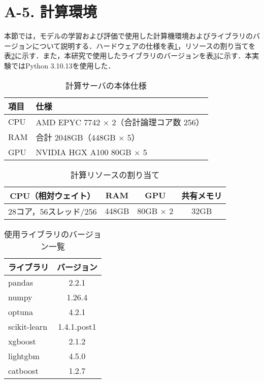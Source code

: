 \section*{A-5. 計算環境}
本節では，モデルの学習および評価で使用した計算機環境およびライブラリのバージョンについて説明する．ハードウェアの仕様を表\ref{tab:server_specs}，リソースの割り当てを表\ref{tab:resource_allocation}に示す．また，本研究で使用したライブラリのバージョンを表\ref{tab:versions}に示す．本実験ではPython 3.10.13を使用した．
\begin{table}[htbp]
    \centering
    \caption{計算サーバの本体仕様}
    \label{tab:server_specs}
    \begin{tabular}{l|p{0.8cm}}
        \hline
        項目 & 仕様 \\
        \hline
        CPU  & AMD EPYC 7742 × 2（合計論理コア数 256） \\
        RAM  & 合計 2048GB（448GB × 5） \\
        GPU  & NVIDIA HGX A100 80GB × 5 \\
        \hline
    \end{tabular}
\end{table}

\begin{table}[htbp]
    \centering
    \caption{計算リソースの割り当て}
    \label{tab:resource_allocation}
    \begin{tabular}{c|c|c|c}
        \hline
        CPU（相対ウェイト） & RAM & GPU & 共有メモリ \\
        \hline
        28コア，56スレッド/256 & 448GB & 80GB × 2 & 32GB  \\
        \hline
    \end{tabular}
\end{table}

\begin{table}[htbp]
    \centering
    \caption{使用ライブラリのバージョン一覧}
    \label{tab:versions}
    \begin{tabular}{l|c}
        \hline
        ライブラリ & バージョン \\
        \hline
        pandas & 2.2.1 \\
        numpy & 1.26.4 \\
        optuna & 4.2.1 \\
        scikit-learn & 1.4.1.post1 \\
        xgboost & 2.1.2 \\
        lightgbm & 4.5.0 \\
        catboost & 1.2.7 \\
        \hline
    \end{tabular}
\end{table}

